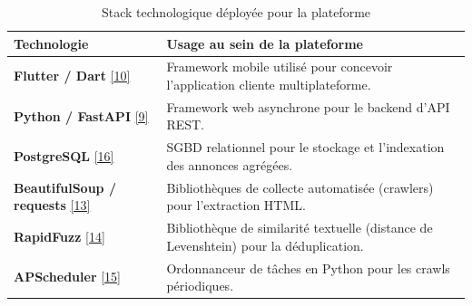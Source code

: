 \begin{table}[H]
    \centering
    \small
    \renewcommand{\arraystretch}{1.5}
    \begin{tabular}{|l|p{10cm}|}
        \hline
        \rowcolor{headergray}
        \textbf{Technologie} & \textbf{Usage au sein de la plateforme} \\ \hline
        \textbf{Flutter / Dart} \hyperref[ref:flutter]{[10]} & Framework mobile utilisé pour concevoir l'application cliente multiplateforme. \\ \hline
        \textbf{Python / FastAPI} \hyperref[ref:fastapi]{[9]} & Framework web asynchrone pour le backend d'API REST. \\ \hline
        \textbf{PostgreSQL} \hyperref[ref:postgresql]{[16]} & SGBD relationnel pour le stockage et l'indexation des annonces agrégées. \\ \hline
        \textbf{BeautifulSoup / requests} \hyperref[ref:beautifulsoup]{[13]} & Bibliothèques de collecte automatisée (crawlers) pour l'extraction HTML. \\ \hline
        \textbf{RapidFuzz} \hyperref[ref:rapidfuzz]{[14]} & Bibliothèque de similarité textuelle (distance de Levenshtein) pour la déduplication. \\ \hline
        \textbf{APScheduler} \hyperref[ref:apscheduler]{[15]} & Ordonnanceur de tâches en Python pour les crawls périodiques. \\ \hline
    \end{tabular}
    \caption{Stack technologique déployée pour la plateforme}
    \label{tab:stack_technologique}
\end{table}